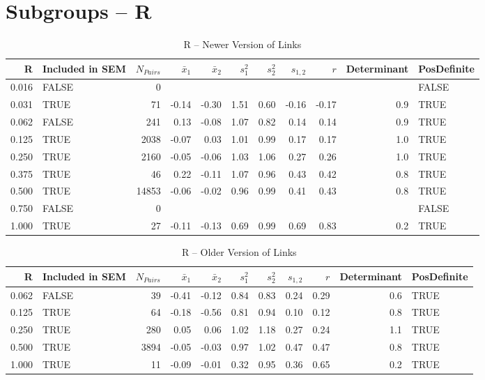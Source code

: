 \documentclass{article}\usepackage[]{graphicx}\usepackage[]{color}
\begin{document}
\section{Subgroups --  R }%
\begin{table}[ht]
\centering
\begin{tabular}{rlrrrrrrrrl}
  \hline
R & Included in SEM & $N_{Pairs}$ & $\bar{x}_1$ & $\bar{x}_2$ & $s_1^2$ & $s_2^2$ & $s_{1,2}$ & $r$ & Determinant & PosDefinite \\ 
  \hline
0.016 & FALSE & 0 &  &  &  &  &  &  &  & FALSE \\ 
  0.031 & TRUE & 71 & -0.14 & -0.30 & 1.51 & 0.60 & -0.16 & -0.17 & 0.9 & TRUE \\ 
  0.062 & FALSE & 241 & 0.13 & -0.08 & 1.07 & 0.82 & 0.14 & 0.14 & 0.9 & TRUE \\ 
  0.125 & TRUE & 2038 & -0.07 & 0.03 & 1.01 & 0.99 & 0.17 & 0.17 & 1.0 & TRUE \\ 
  0.250 & TRUE & 2160 & -0.05 & -0.06 & 1.03 & 1.06 & 0.27 & 0.26 & 1.0 & TRUE \\ 
  0.375 & TRUE & 46 & 0.22 & -0.11 & 1.07 & 0.96 & 0.43 & 0.42 & 0.8 & TRUE \\ 
  0.500 & TRUE & 14853 & -0.06 & -0.02 & 0.96 & 0.99 & 0.41 & 0.43 & 0.8 & TRUE \\ 
  0.750 & FALSE & 0 &  &  &  &  &  &  &  & FALSE \\ 
  1.000 & TRUE & 27 & -0.11 & -0.13 & 0.69 & 0.99 & 0.69 & 0.83 & 0.2 & TRUE \\ 
   \hline
\end{tabular}
\caption{R -- Newer Version of Links} 
\end{table}
\begin{table}[ht]
\centering
\begin{tabular}{rlrrrrrrrrl}
  \hline
R & Included in SEM & $N_{Pairs}$ & $\bar{x}_1$ & $\bar{x}_2$ & $s_1^2$ & $s_2^2$ & $s_{1,2}$ & $r$ & Determinant & PosDefinite \\ 
  \hline
0.062 & FALSE & 39 & -0.41 & -0.12 & 0.84 & 0.83 & 0.24 & 0.29 & 0.6 & TRUE \\ 
  0.125 & TRUE & 64 & -0.18 & -0.56 & 0.81 & 0.94 & 0.10 & 0.12 & 0.8 & TRUE \\ 
  0.250 & TRUE & 280 & 0.05 & 0.06 & 1.02 & 1.18 & 0.27 & 0.24 & 1.1 & TRUE \\ 
  0.500 & TRUE & 3894 & -0.05 & -0.03 & 0.97 & 1.02 & 0.47 & 0.47 & 0.8 & TRUE \\ 
  1.000 & TRUE & 11 & -0.09 & -0.01 & 0.32 & 0.95 & 0.36 & 0.65 & 0.2 & TRUE \\ 
   \hline
\end{tabular}
\caption{R -- Older Version of Links} 
\end{table}
\newpage 
\end{document}
